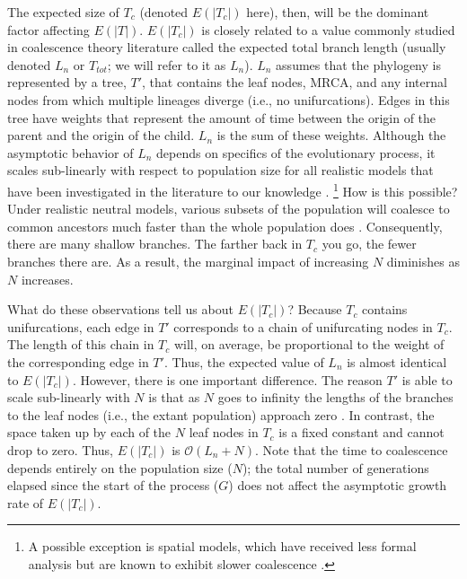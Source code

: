 The expected size of $T_c$ (denoted $E(|T_c|)$ here), then, will be the dominant factor affecting $E(|T|)$.
$E(|T_c|)$ is closely related to a value commonly studied in coalescence theory literature called the expected total branch length (usually denoted $L_n$ or $T_{tot}$; we will refer to it as $L_n$).
$L_n$ assumes that the phylogeny is represented by a tree, $T'$, that contains the leaf nodes, MRCA, and any internal nodes from which multiple lineages diverge (i.e., no unifurcations).
Edges in this tree have weights that represent the amount of time between the origin of the parent and the origin of the child.
$L_n$ is the sum of these weights.
Although the asymptotic behavior of $L_n$ depends on specifics of the evolutionary process, it scales sub-linearly with respect to population size for all realistic models that have been investigated in the literature to our knowledge \citep{gnedin2014lambda}.%
\footnote{A possible exception is spatial models, which have received less formal analysis but are known to exhibit slower coalescence \citep{berestycki2009recent}.}
How is this possible?
Under realistic neutral models, various subsets of the population will coalesce to common ancestors much faster than the whole population does \citep{nordborg2019coalescent}.
Consequently, there are many shallow branches.
The farther back in $T_c$ you go, the fewer branches there are.
As a result, the marginal impact of increasing $N$ diminishes as $N$ increases.

What do these observations tell us about $E(|T_c|)$?
Because $T_c$ contains unifurcations, each edge in $T'$ corresponds to a chain of unifurcating nodes in $T_c$.
The length of this chain in $T_c$ will, on average, be proportional to the weight of the corresponding edge in $T'$.
Thus, the expected value of $L_n$ is almost identical to $E(|T_c|)$.
However, there is one important difference.
The reason $T'$ is able to scale sub-linearly with $N$ is that as $N$ goes to infinity the lengths of the branches to the leaf nodes (i.e., the extant population) approach zero \citep{nordborg2019coalescent, delmas2008asymptotic, drmota2007asymptotic}.
In contrast, the space taken up by each of the $N$ leaf nodes in $T_c$ is a fixed constant and cannot drop to zero.
Thus, $E(|T_c|)$ is $\mathcal{O}(L_n + N)$.
Note that the time to coalescence depends entirely on the population size ($N$); the total number of generations elapsed since the start of the process ($G$) does not affect the asymptotic growth rate of $E(|T_c|)$.

